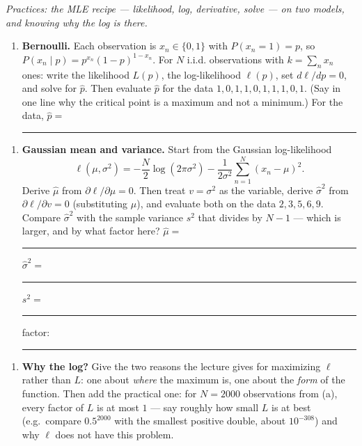 \documentclass[
  11pt,
]{article}
\providecommand{\tightlist}{%
  \setlength{\itemsep}{0pt}\setlength{\parskip}{0pt}}
\newcommand{\answerspace}[1]{\par\vspace*{#1}}  %
\newcommand{\blank}[1][1.2in]{\rule{#1}{0.4pt}}
\begin{document}
\emph{Practices: the MLE recipe --- likelihood, log, derivative, solve
--- on two models, and knowing why the log is there.}

\begin{enumerate}
\def\labelenumi{(\alph{enumi})}
\tightlist
\item
  \textbf{Bernoulli.} Each observation is \(x_n\in\{0,1\}\) with
  \(P(x_n = 1) = p\), so \(P(x_n\mid p) = p^{x_n}(1-p)^{1-x_n}\). For
  \(N\) i.i.d. observations with \(k = \sum_n x_n\) ones: write the
  likelihood \(L(p)\), the log-likelihood \(\ell(p)\), set
  \(d\ell/dp = 0\), and solve for \(\hat p\). Then evaluate \(\hat p\)
  for the data \(1,0,1,1,0,1,1,1,0,1\). (Say in one line why the
  critical point is a maximum and not a minimum.) For the data,
  \(\hat p =\) \blank[0.8in]
\end{enumerate}

\answerspace{3in}

\begin{enumerate}
\def\labelenumi{(\alph{enumi})}
\setcounter{enumi}{1}
\tightlist
\item
  \textbf{Gaussian mean and variance.} Start from the Gaussian
  log-likelihood
  \[\ell(\mu,\sigma^2) = -\frac N2\log(2\pi\sigma^2) - \frac{1}{2\sigma^2}\sum_{n=1}^N (x_n-\mu)^2 .\]
  Derive \(\hat\mu\) from \(\partial\ell/\partial\mu = 0\). Then treat
  \(v = \sigma^2\) as the variable, derive \(\hat\sigma^2\) from
  \(\partial\ell/\partial v = 0\) (substituting \(\hat\mu\)), and
  evaluate both on the data \(2, 3, 5, 6, 9\). Compare \(\hat\sigma^2\)
  with the sample variance \(s^2\) that divides by \(N-1\) --- which is
  larger, and by what factor here? \(\hat\mu =\)
  \blank[0.6in]\quad \(\hat\sigma^2 =\) \blank[0.6in]\quad \(s^2 =\)
  \blank[0.6in]\quad factor: \blank[0.6in]
\end{enumerate}

\answerspace{3in}

\begin{enumerate}
\def\labelenumi{(\alph{enumi})}
\setcounter{enumi}{2}
\tightlist
\item
  \textbf{Why the log?} Give the two reasons the lecture gives for
  maximizing \(\ell\) rather than \(L\): one about \emph{where} the
  maximum is, one about the \emph{form} of the function. Then add the
  practical one: for \(N = 2000\) observations from (a), every factor of
  \(L\) is at most \(1\) --- say roughly how small \(L\) is at best
  (e.g.~compare \(0.5^{2000}\) with the smallest positive double, about
  \(10^{-308}\)) and why \(\ell\) does not have this problem.
\end{enumerate}
\end{document}

